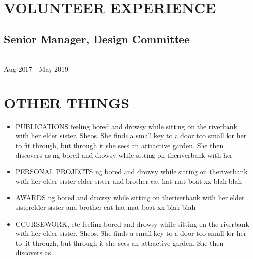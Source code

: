 \documentclass{resume}
\begin{document}
\begin{minipage}{0.60\linewidth}
\section{VOLUNTEER EXPERIENCE}
 \color{sub}\large
 \subsection{Senior Manager, Design Committee}
 \\
\color{sub}\fontsize{10pt}{10pt}\faCalendar \vspace{1pt} 
\color{sub}\fontsize{10pt}{10pt}Aug 2017 - May 2019
\section{OTHER THINGS} \vspace{3pt}
\begin{itemize}
\color{sub}\fontsize{12pt}{10pt}
    \item PUBLICATIONS feeling bored and drowsy while sitting on the riverbank with her elder sister. Sheos. She finds a small key to a door too small for her to fit through, but through it she sees an attractive garden. She then discovers as ng bored and drowsy while sitting on theriverbank with her 
    \item PERSONAL PROJECTS ng bored and drowsy while sitting on theriverbank with her elder sister elder sister and brother cat hat mat boat xx blah blah
    \item AWARDS ng bored and drowsy while sitting on theriverbank with her elder sisterelder sister and brother cat hat mat boat xx blah blah
    \item COURSEWORK, etc feeling bored and drowsy while sitting on the riverbank with her elder sister. Sheos. She finds a small key to a door too small for her to fit through, but through it she sees an attractive garden. She then discovers as
\end{itemize}
\end{minipage}%
\end{document}

